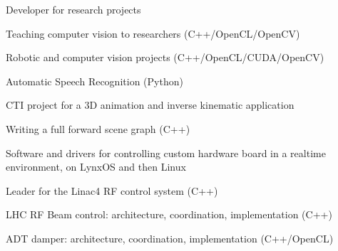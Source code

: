 \documentclass[a4paper]{deedy-resume} %
\begin{document}
\begin{minipage}[t]{0.66\textwidth}
\sectionspace %


	Developer for research projects
	\begin{tightitemize}
		\item Teaching computer vision to researchers (C++/OpenCL/OpenCV)
		\item Robotic and computer vision projects (C++/OpenCL/CUDA/OpenCV)
		\item Automatic Speech Recognition (Python)
	\end{tightitemize}

\sectionspace %


	CTI project for a 3D animation and inverse kinematic application
	\begin{tightitemize}
		\item Writing a full forward scene graph (C++)
	\end{tightitemize}

\sectionspace %


	Software and drivers for controlling custom hardware board in a realtime
    environment, on LynxOS and then Linux
	\begin{tightitemize}
		\item Leader for the Linac4 RF control system (C++)
		\item LHC RF Beam control: architecture, coordination, implementation (C++)
		\item ADT damper: architecture, coordination, implementation (C++/OpenCL)
	\end{tightitemize}

\sectionspace %



\end{minipage}
\end{document}
